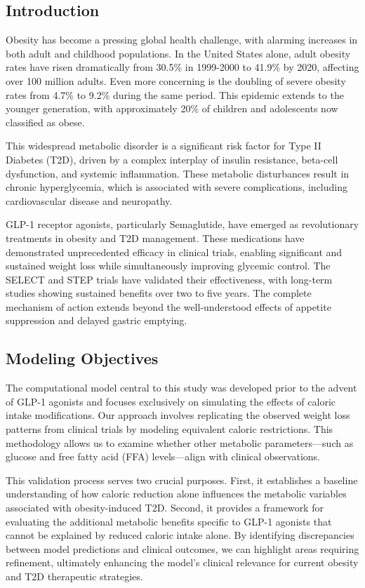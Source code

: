 \begin{multicols}{2}
\tableofcontents
\section{Introduction}
Obesity has become a pressing global health challenge, with alarming increases in both adult and childhood populations. In the United States alone, adult obesity rates have risen dramatically from 30.5\% in 1999-2000 to 41.9\% by 2020, affecting over 100 million adults. Even more concerning is the doubling of severe obesity rates from 4.7\% to 9.2\% during the same period. This epidemic extends to the younger generation, with approximately 20\% of children and adolescents now classified as obese\cite{CDC2024a,CDC2024b}.

This widespread metabolic disorder is a significant risk factor for Type II Diabetes (T2D), driven by a complex interplay of insulin resistance, beta-cell dysfunction, and systemic inflammation. These metabolic disturbances result in chronic hyperglycemia, which is associated with severe complications, including cardiovascular disease and neuropathy.

GLP-1 receptor agonists, particularly Semaglutide, have emerged as revolutionary treatments in obesity and T2D management. These medications have demonstrated unprecedented efficacy in clinical trials, enabling significant and sustained weight loss while simultaneously improving glycemic control. The SELECT and STEP trials have validated their effectiveness, with long-term studies showing sustained benefits over two to five years\cite{Garvey2022,Ryan2024}. The complete mechanism of action extends beyond the well-understood effects of appetite suppression and delayed gastric emptying.

\subsection{Modeling Objectives}
The computational model central to this study was developed prior to the advent of GLP-1 agonists and focuses exclusively on simulating the effects of caloric intake modifications. Our approach involves replicating the observed weight loss patterns from clinical trials by modeling equivalent caloric restrictions. This methodology allows us to examine whether other metabolic parameters—such as glucose and free fatty acid (FFA) levels—align with clinical observations.

This validation process serves two crucial purposes. First, it establishes a baseline understanding of how caloric reduction alone influences the metabolic variables associated with obesity-induced T2D. Second, it provides a framework for evaluating the additional metabolic benefits specific to GLP-1 agonists that cannot be explained by reduced caloric intake alone. By identifying discrepancies between model predictions and clinical outcomes, we can highlight areas requiring refinement, ultimately enhancing the model's clinical relevance for current obesity and T2D therapeutic strategies.
\end{multicols}